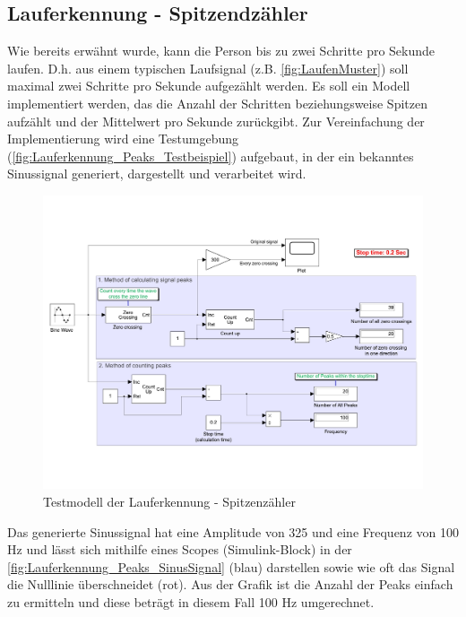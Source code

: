 \subsection{Lauferkennung - Spitzendzähler} \label{abs:PeaksAufzaehlen} %

Wie bereits erwähnt wurde, kann die Person bis zu zwei Schritte pro Sekunde laufen. D.h. aus einem typischen Laufsignal (z.B. \autoref{fig:LaufenMuster}) soll maximal zwei Schritte pro Sekunde aufgezählt werden.
Es soll ein Modell implementiert werden, das die Anzahl der Schritten beziehungsweise Spitzen aufzählt und der Mittelwert pro Sekunde zurückgibt. Zur Vereinfachung der Implementierung wird eine Testumgebung (\autoref{fig:Lauferkennung_Peaks_Testbeispiel}) aufgebaut, in der ein bekanntes Sinussignal generiert, dargestellt und verarbeitet wird.
\begin{figure}[H]
	\centering
	\includegraphics[width=0.8\linewidth]{Bilder/TestModellLauferkennungSpitzenzaehler.pdf} %
	\caption{Testmodell der Lauferkennung - Spitzenzähler}
	\label{fig:Lauferkennung_Peaks_Testbeispiel}
\end{figure}
Das generierte Sinussignal hat eine Amplitude von 325 und eine Frequenz von 100 Hz und lässt sich mithilfe eines Scopes (Simulink-Block) in der \autoref{fig:Lauferkennung_Peaks_SinusSignal} (blau) darstellen sowie wie oft das Signal die Nulllinie überschneidet (rot). Aus der Grafik ist die Anzahl der Peaks einfach zu ermitteln und diese beträgt in diesem Fall 100 Hz umgerechnet. %

